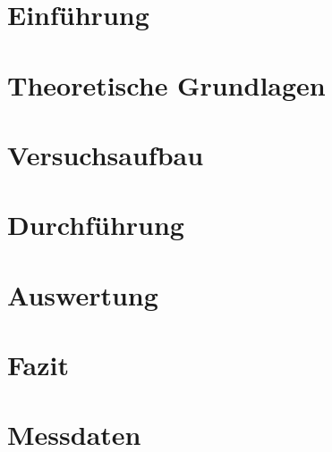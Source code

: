 \documentclass[
    abteilunga,         %
    english,ngerman     %
]{tudfp}
\begin{document}
\maketitle

\tableofcontents
\cleardoublepage


\section{Einführung}
%


\section{Theoretische Grundlagen}
%


\section{Versuchsaufbau}
%


\section{Durchführung}
%


\section{Auswertung}
%


\section{Fazit}
%




\section{Messdaten}
%


\end{document}
